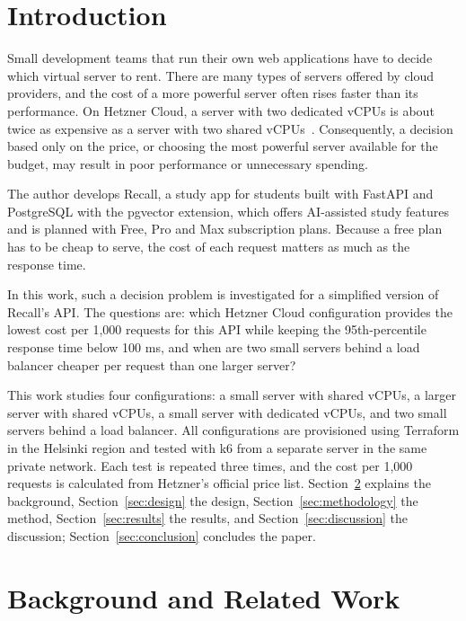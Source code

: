 \documentclass[conference,a4paper]{IEEEtran}
\begin{document}
\section{Introduction}
\label{sec:introduction}

Small development teams that run their own web applications have to decide which virtual server to rent. There are many types of servers offered by cloud providers, and the cost of a more powerful server often rises faster than its performance. On Hetzner Cloud, a server with two dedicated vCPUs is about twice as expensive as a server with two shared vCPUs~\cite{hz-api}. Consequently, a decision based only on the price, or choosing the most powerful server available for the budget, may result in poor performance or unnecessary spending.

The author develops Recall, a study app for students built with FastAPI and PostgreSQL with the pgvector extension, which offers AI-assisted study features and is planned with Free, Pro and Max subscription plans. Because a free plan has to be cheap to serve, the cost of each request matters as much as the response time.

In this work, such a decision problem is investigated for a simplified version of Recall's API. The questions are: which Hetzner Cloud configuration provides the lowest cost per 1,000 requests for this API while keeping the 95th-percentile response time below 100 ms, and when are two small servers behind a load balancer cheaper per request than one larger server?

This work studies four configurations: a small server with shared vCPUs, a larger server with shared vCPUs, a small server with dedicated vCPUs, and two small servers behind a load balancer. All configurations are provisioned using Terraform in the Helsinki region and tested with k6 from a separate server in the same private network. Each test is repeated three times, and the cost per 1,000 requests is calculated from Hetzner's official price list. Section~\ref{sec:related_work} explains the background, Section~\ref{sec:design} the design, Section~\ref{sec:methodology} the method, Section~\ref{sec:results} the results, and Section~\ref{sec:discussion} the discussion; Section~\ref{sec:conclusion} concludes the paper.

\section{Background and Related Work}
\label{sec:related_work}
\end{document}
